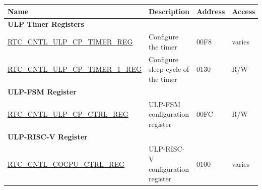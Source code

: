 \begin{longtable}{ | p{6cm} | p{7.2cm} | p{1.3cm} | p{1cm} | }
\hline\rowcolor{lightgray}
Name & Description &  Address & Access \\ \hline
\endhead
\multicolumn{4}{|l|}{\textbf{ULP Timer Registers}} \\ \hline
\hyperref[regdesc:RTCCNTLULPCPTIMERREG]{RTC\_CNTL\_ULP\_CP\_TIMER\_REG} & Configure the timer & \hexprefix{}00F8 & varies \\ \hline
\hyperref[regdesc:RTCCNTLULPCPTIMER1REG]{RTC\_CNTL\_ULP\_CP\_TIMER\_1\_REG} & Configure sleep cycle of the timer & \hexprefix{}0130 & R/W \\ \hline
\multicolumn{4}{|l|}{\textbf{ULP-FSM Register}} \\ \hline
\hyperref[regdesc:RTCCNTLULPCPCTRLREG]{RTC\_CNTL\_ULP\_CP\_CTRL\_REG} & ULP-FSM configuration register & \hexprefix{}00FC & R/W \\ \hline
\multicolumn{4}{|l|}{\textbf{ULP-RISC-V Register}} \\ \hline
\hyperref[regdesc:RTCCNTLCOCPUCTRLREG]{RTC\_CNTL\_COCPU\_CTRL\_REG} & ULP-RISC-V configuration register & \hexprefix{}0100 & varies \\ \hline
\end{longtable}

